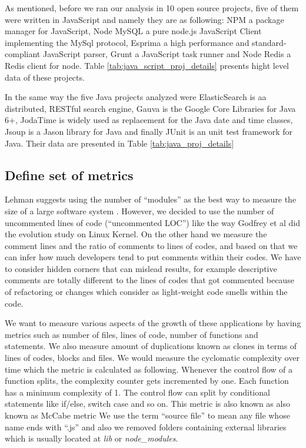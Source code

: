 As mentioned, before we ran our analysis in 10 open source projects, five of them were written in JavaScript and namely they are as following: NPM a package manager for JavaScript, Node MySQL a pure node.js JavaScript Client implementing the MySql protocol, Esprima a high performance and standard-compliant JavaScript parser, Grunt a JavaScript task runner and Node Redis a Redis client for node. Table \ref{tab:java_script_proj_details} presents hight level data of these projects.

In the same way the five Java projects analyzed were ElasticSearch is aa distributed, RESTful search engine, Gauva is the Google Core Libraries for Java 6+, JodaTime is widely used as replacement for the Java date and time classes, Jsoup is a Jason library for Java and finally JUnit is an unit test framework for Java. Their data are presented in Table \ref{tab:java_proj_details}     


\subsection{Define set of metrics}

Lehman suggests using the number of “modules” as the best way to measure the size of a large software system \cite{Lehman1997METRICS}. However, we decided to use the number of uncommented lines of code (“uncommented LOC”) like the way Godfrey et al \cite{Godfrey2000ICMS} did the evolution study on Linux Kernel. On the other hand we measure the comment lines and the ratio of comments to lines of codes, and based on that we can infer how much developers tend to put comments within their codes. We have to consider hidden corners that can mislead results, for example descriptive comments are totally different to the lines of codes that got commented because of refactoring or changes which consider as light-weight code smells within the code.

We want to measure various aspects of the growth of these applications by having metrics such as number of files, lines of code, number of functions and statements. We also measure amount of duplications known as clones in terms of lines of codes, blocks and files. We would measure the cyclomatic complexity over time which the metric is calculated as following. Whenever the control flow of a function splits, the complexity counter gets incremented by one. Each function has a minimum complexity of 1. The control flow can split by conditional statements like if/else, switch case and so on. This metric is also known as also known as McCabe metric
We use the term “source file” to mean any file whose name ends with “.js” and also we removed folders containing external libraries which is usually located at \textit{lib} or \textit{node\_modules}. 

